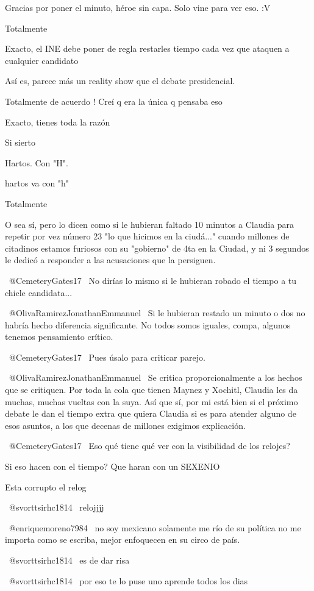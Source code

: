 Gracias por poner el minuto, héroe sin capa. Solo vine para ver eso. :V

Totalmente 👍🏼

Exacto, el INE debe poner de regla restarles tiempo cada vez que ataquen a cualquier candidato

Así es, parece más un reality show que el debate presidencial.

Totalmente de acuerdo ! Creí q era la única q pensaba eso

Exacto, tienes toda la razón

Si sierto

Hartos. Con "H".

hartos va con "h"

Totalmente

O sea sí, pero lo dicen como si le hubieran faltado 10 minutos a Claudia para repetir por vez número 23 "lo que hicimos en la ciudá..." cuando millones de citadinos estamos furiosos con su "gobierno" de 4ta en la Ciudad, y ni 3 segundos le dedicó a responder a las acusaciones que la persiguen.

​ @CemeteryGates17  No dirías lo mismo si le hubieran robado el tiempo a tu chicle candidata...

 @OlivaRamirezJonathanEmmanuel  Si le hubieran restado un minuto o dos no habría hecho diferencia significante. No todos somos iguales, compa, algunos tenemos pensamiento crítico.

 @CemeteryGates17  Pues úsalo para criticar parejo.

 @OlivaRamirezJonathanEmmanuel  Se critica proporcionalmente a los hechos que se critiquen. Por toda la cola que tienen Maynez y Xochitl, Claudia les da muchas, muchas vueltas con la suya. Así que sí, por mi está bien si el próximo debate le dan el tiempo extra que quiera Claudia si es para atender alguno de esos asuntos, a los que decenas de millones exigimos explicación.

 @CemeteryGates17  Eso qué tiene qué ver con la visibilidad de los relojes?

Si eso hacen con el tiempo? Que haran con un SEXENIO

Esta corrupto el relog

 @svorttsirhc1814  relojjjj

 @enriquemoreno7984  no soy mexicano solamente me río de su política no me importa como se escriba, mejor enfoquecen en su circo de país.

 @svorttsirhc1814  es de dar risa

 @svorttsirhc1814  por eso te lo puse uno aprende todos los dias

